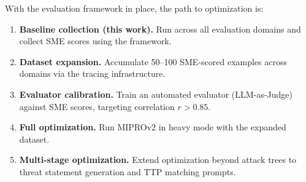 With the evaluation framework in place, the path to optimization is:

\begin{enumerate}
    \item \textbf{Baseline collection (this work).} Run \threatforest{} across all evaluation domains and collect SME scores using the framework.
    \item \textbf{Dataset expansion.} Accumulate 50--100 SME-scored examples across domains via the tracing infrastructure.
    \item \textbf{Evaluator calibration.} Train an automated evaluator (LLM-as-Judge) against SME scores, targeting correlation $r > 0.85$.
    \item \textbf{Full optimization.} Run MIPROv2 in heavy mode with the expanded dataset.
    \item \textbf{Multi-stage optimization.} Extend optimization beyond attack trees to threat statement generation and TTP matching prompts.
\end{enumerate}
